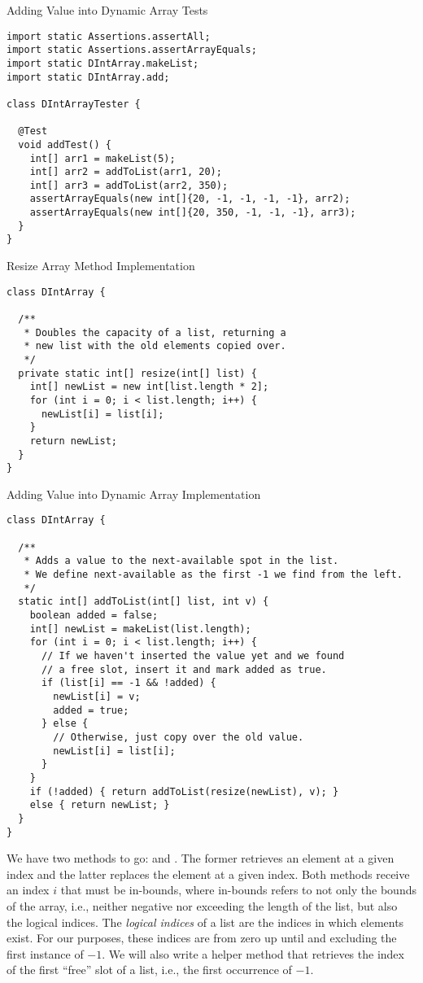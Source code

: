 \begin{cl}[]{Adding Value into Dynamic Array Tests}
\begin{lstlisting}[language=MyJava]
import static Assertions.assertAll;
import static Assertions.assertArrayEquals;
import static DIntArray.makeList;
import static DIntArray.add;

class DIntArrayTester {

  @Test
  void addTest() {
    int[] arr1 = makeList(5);
    int[] arr2 = addToList(arr1, 20);
    int[] arr3 = addToList(arr2, 350);
    assertArrayEquals(new int[]{20, -1, -1, -1, -1}, arr2);
    assertArrayEquals(new int[]{20, 350, -1, -1, -1}, arr3);
  }
}
\end{lstlisting}
\end{cl}

\begin{cl}[]{Resize Array Method Implementation}
\begin{lstlisting}[language=MyJava]
class DIntArray {

  /**
   * Doubles the capacity of a list, returning a 
   * new list with the old elements copied over.
   */
  private static int[] resize(int[] list) {
    int[] newList = new int[list.length * 2];
    for (int i = 0; i < list.length; i++) {
      newList[i] = list[i];
    }
    return newList;
  }
}
\end{lstlisting}
\end{cl}

\begin{cl}[]{Adding Value into Dynamic Array Implementation}
\begin{lstlisting}[language=MyJava]
class DIntArray {

  /**
   * Adds a value to the next-available spot in the list.
   * We define next-available as the first -1 we find from the left.
   */
  static int[] addToList(int[] list, int v) {
    boolean added = false;
    int[] newList = makeList(list.length);
    for (int i = 0; i < list.length; i++) {
      // If we haven't inserted the value yet and we found
      // a free slot, insert it and mark added as true.
      if (list[i] == -1 && !added) {
        newList[i] = v;
        added = true;
      } else {
        // Otherwise, just copy over the old value.
        newList[i] = list[i];
      }
    }
    if (!added) { return addToList(resize(newList), v); } 
    else { return newList; }
  }
}
\end{lstlisting}
\end{cl}

We have two methods to go:  and . The former retrieves an element at a given index and the latter replaces the element at a given index. Both methods receive an index $i$ that must be in-bounds, where in-bounds refers to not only the bounds of the array, i.e., neither negative nor exceeding the length of the list, but also the logical indices. The \textit{logical indices} of a list are the indices in which elements exist. For our purposes, these indices are from zero up until and excluding the first instance of $-1$. We will also write a helper method that retrieves the index of the first ``free'' slot of a list, i.e., the first occurrence of $-1$.

